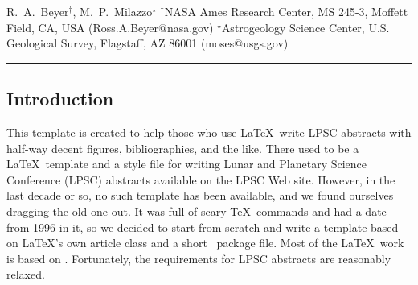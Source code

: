 \documentclass[twoside]{article}
\begin{document}

{R.~A.~Beyer$^{\dag}$, M.~P.~Milazzo$^{\star}$ $^{\dag}$NASA Ames Research Center, MS 245-3, Moffett Field, CA, USA (Ross.A.Beyer@nasa.gov) $^{\star}
$Astrogeology Science Center, U.S. Geological Survey, Flagstaff, AZ 86001 (moses@usgs.gov) \\ \hrule
} 

%

%


\balance


\subsection*{Introduction} This template is created to help those who use \LaTeX\ write LPSC abstracts with half-way decent figures, bibliographies, 
and the like.
There used to be a \LaTeX\ template and a style file for writing Lunar and Planetary Science Conference (LPSC) abstracts available
on the LPSC Web site.
However, in the last decade or so, no such template has been available, and we found ourselves dragging the old one out.
It was full of scary \TeX\ commands and had a date from 1996 in it, so we decided to start from scratch and write a template based on \LaTeX's own article class and a short \LaTeXe\ package file.  
Most of the \LaTeX\ work is based on \citep{kopka2003guide}.
Fortunately, the requirements for LPSC abstracts \citep{LPSC} are reasonably relaxed.
\end{document}
